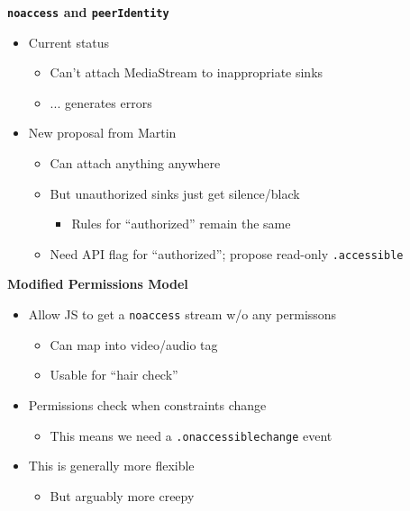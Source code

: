 \documentclass[helvetica]{seminar}
\newcommand{\heading}[1]{%
  \begin{center} 
    \large\bf 
    #1 
  \end{center} 
  \vspace{.4 in}}
\begin{document}
\begin{slide}
\heading{\texttt{noaccess} and \texttt{peerIdentity}}

\begin{itemize}
\item Current status
  \begin{itemize}
    \item Can't attach MediaStream to inappropriate sinks
    \item ... generates errors
  \end{itemize}

\item New proposal from Martin
  \begin{itemize}
    \item Can attach anything anywhere
    \item But unauthorized sinks just get silence/black
      \begin{itemize}
        \item Rules for ``authorized'' remain the same
      \end{itemize}
    \item Need API flag for ``authorized''; propose read-only \verb^.accessible^
  \end{itemize}
\end{itemize}

\end{slide}

\begin{slide}
\heading{Modified Permissions Model}


\begin{itemize}
\item Allow JS to get a \verb^noaccess^ stream w/o any permissons
  \begin{itemize}
  \item Can map into video/audio tag
  \item Usable for ``hair check''
  \end{itemize}

\item Permissions check when constraints change
  \begin{itemize}
  \item This means we need a \verb^.onaccessiblechange^ event
  \end{itemize}

\item This is generally more flexible
  \begin{itemize}
    \item But arguably more creepy
  \end{itemize}
\end{itemize}
\end{slide}
\end{document}
